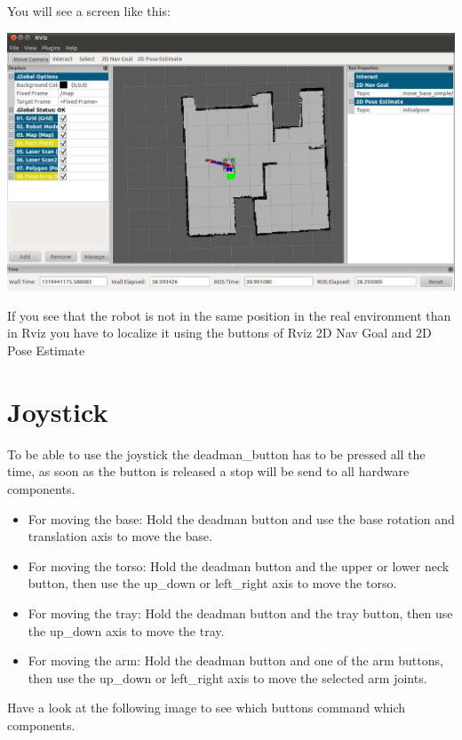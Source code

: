 You will see a screen like this:
\begin {center}
 \includegraphics[width=1\textwidth]{images/rviz.png}
\end{center}
If you see that the robot is not in the same position in the real environment than in Rviz you have to localize it using  the buttons of Rviz 2D Nav Goal  and 2D Pose Estimate

\section{Joystick}
To be able to use the joystick the deadman\_button has to be pressed all the time, as soon as the button is released a stop will be send to all hardware components. 

\begin{itemize}
\item For moving the base: Hold the deadman button and use the base rotation and translation axis to move the base.

\item For moving the torso: Hold the deadman button and the upper or lower neck button, then use the up\_down or left\_right axis to move the torso.

\item For moving the tray: Hold the deadman button and the tray button, then use the up\_down axis to move the tray.

\item For moving the arm: Hold the deadman button and one of the arm buttons, then use the up\_down or left\_right axis to move the selected arm joints.
\end{itemize}

Have a look at the following image to see which buttons command which components. 

